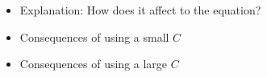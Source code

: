 \begin{itemize}
	\item Explanation: How does it affect to the equation?
	\item Consequences of using a small $C$
	\item Consequences of using a large $C$
\end{itemize}